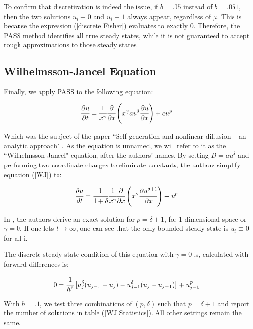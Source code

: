 \documentclass{article}
\begin{document}
To confirm that discretization is indeed the issue, if $b = .05$ instead of $b = .051$, then the two solutions $u_i \equiv 0$ and $u_i \equiv 1$ always appear, regardless of $\mu$. This is because the expression (\ref{discrete Fisher}) evaluates to exactly 0. Therefore, the PASS method identifies all true steady states, while it is not guaranteed to accept rough approximations to those steady states.

\subsection{Wilhelmsson-Jancel Equation}

Finally, we apply PASS to the following equation:

\begin{equation}
    \label{WJ}
    \cfrac{\partial{u}}{\partial{t}} = \cfrac{1}{x^\gamma} \cfrac{\partial}{\partial{x}} \left( x^\gamma au^\delta \cfrac{\partial{u}}{\partial{x}} \right) + cu^p
\end{equation}

Which was the subject of the paper ``Self-generation and nonlinear diffusion – an analytic approach" \citep{WJ}. As the equation is unnamed, we will refer to it as the ``Wilhelmsson-Jancel" equation, after the authors' names. By setting $D = au^\delta$ and performing two coordinate changes to eliminate constants, the authors simplify equation (\ref{WJ}) to:

\begin{equation}
  \label{Simplified WJ}
  \cfrac{\partial{u}}{\partial{t}} = \cfrac{1}{1+\delta} \cfrac{1}{x^\gamma} \cfrac{\partial}{\partial{x}}\left(x^\gamma \cfrac{\partial{u^{\delta + 1}}}{\partial{x}} \right) + u^p
\end{equation}

In \citep{WJ}, the authors derive an exact solution for $p = \delta + 1$, for 1 dimensional space or $\gamma = 0$. If one lets $t \rightarrow \infty$, one can see that the only bounded steady state is $u_i \equiv 0$ for all i.

The discrete steady state condition of this equation with $\gamma = 0$ is, calculated with forward differences is:

\begin{equation}
  \label{discrete WJ}
  0 = \cfrac{1}{h^2} \left[ u_{j}^\delta (u_{j+1} - u_{j}) - u_{j-1}^\delta (u_{j} - u_{j-1}) \right] + u_{j-1}^p
\end{equation}

With $h = .1$, we test three combinations of $(p, \delta)$ such that $p = \delta + 1$ and report the number of solutions in table (\ref{WJ Statistics}). All other settings remain the same.
\end{document}
